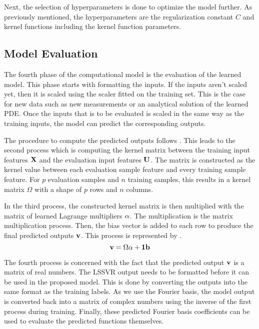 Next, the selection of hyperparameters is done to optimize the model further. As previously mentioned, the hyperparameters are the regularization constant \(C \) and kernel functions including the kernel function parameters. 

\subsection{Model Evaluation}
\noindent The fourth phase of the computational model is the evaluation of the learned model. This phase starts with formatting the inputs. If the inputs aren't scaled yet, then it is scaled using the scaler fitted on the training set. This is the case for new data such as new measurements or an analytical solution of the learned PDE\@. Once the inputs that is to be evaluated is scaled in the same way as the training inputs, the model can predict the corresponding outputs.

The procedure to compute the predicted outputs follows . This leads to the second process which is computing the kernel matrix between the training input features \(\vb{X}\) and the evaluation input features \(\vb{U}\). The matrix is constructed as the kernel value between each evaluation sample feature and every training sample feature. For \(p \) evaluation samples and \(n \) training samples, this results in a kernel matrix \(\Omega \) with a shape of \(p \) rows and \(n \) columns.

In the third process, the constructed kernel matrix is then multiplied with the matrix of learned Lagrange multipliers \(\vb{\alpha}\). The multiplication is the matrix multiplication process. Then, the bias vector is added to each row to produce the final predicted outputs \(\vb{v}\). This process is represented by .
\begin{equation}
  \vb{v} = \Omega\vb{\alpha}+\vb{1}\vb{b} \label{eq:lssvr_prediction_vectorized}
\end{equation}

The fourth process is concerned with the fact that the predicted output \(\vb{v}\) is a matrix of real numbers. The LSSVR output needs to be formatted before it can be used in the proposed model. This is done by converting the outputs into the same format as the training labels. As we use the Fourier basis, the model output is converted back into a matrix of complex numbers using the inverse of the first process during training. Finally, these predicted Fourier basis coefficients can be used to evaluate the predicted functions themselves.

